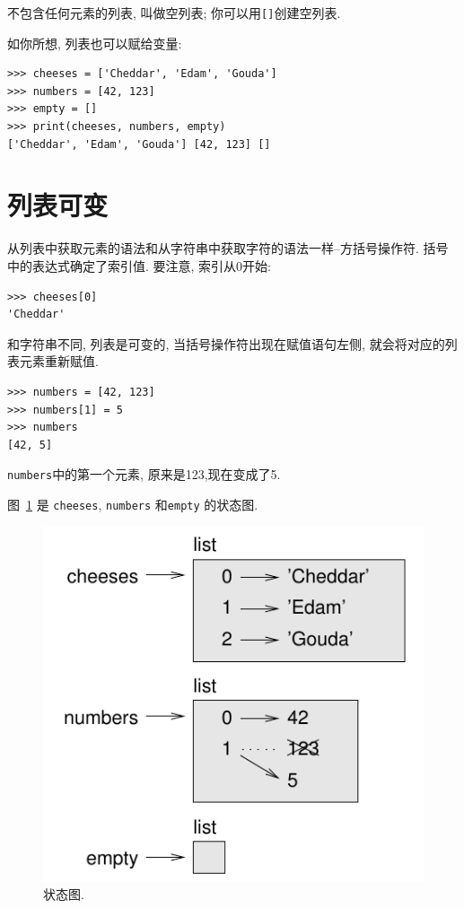 \documentclass[10pt]{book}
\begin{document}
不包含任何元素的列表, 叫做空列表;
你可以用\verb"[]"创建空列表.

如你所想, 列表也可以赋给变量:

\begin{verbatim}
>>> cheeses = ['Cheddar', 'Edam', 'Gouda']
>>> numbers = [42, 123]
>>> empty = []
>>> print(cheeses, numbers, empty)
['Cheddar', 'Edam', 'Gouda'] [42, 123] []
\end{verbatim}
%


\section{列表可变}
\label{mutable}

从列表中获取元素的语法和从字符串中获取字符的语法一样--方括号操作符. 
括号中的表达式确定了索引值. 
要注意, 索引从0开始:

\begin{verbatim}
>>> cheeses[0]
'Cheddar'
\end{verbatim}
%
和字符串不同, 列表是可变的, 当括号操作符出现在赋值语句左侧, 
就会将对应的列表元素重新赋值. 

\begin{verbatim}
>>> numbers = [42, 123]
>>> numbers[1] = 5
>>> numbers
[42, 5]
\end{verbatim}
%
{\tt numbers}中的第一个元素, 原来是123,现在变成了5.


图~\ref{fig.liststate} 是 {\tt cheeses}, {\tt numbers} 和{\tt empty} 的状态图.

\begin{figure}
\centerline
{\includegraphics[scale=0.8]{figs/liststate.pdf}}
\caption{状态图.}
\label{fig.liststate}
\end{figure}
\end{document}
